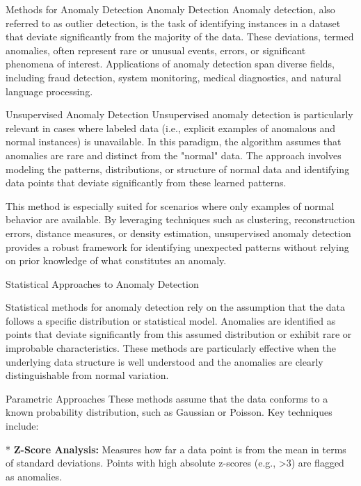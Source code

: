 \chap Methods for Anomaly Detection
\sec Anomaly Detection
Anomaly detection, also referred to as outlier detection, is the task of identifying instances in a dataset that deviate significantly from the majority of the data. These deviations, termed anomalies, often represent rare or unusual events, errors, or significant phenomena of interest. Applications of anomaly detection span diverse fields, including fraud detection, system monitoring, medical diagnostics, and natural language processing.


\secc Unsupervised Anomaly Detection
Unsupervised anomaly detection is particularly relevant in cases where labeled data (i.e., explicit examples of anomalous and normal instances) is unavailable. In this paradigm, the algorithm assumes that anomalies are rare and distinct from the "normal" data. The approach involves modeling the patterns, distributions, or structure of normal data and identifying data points that deviate significantly from these learned patterns.

This method is especially suited for scenarios where only examples of normal behavior are available. By leveraging techniques such as clustering, reconstruction errors, distance measures, or density estimation, unsupervised anomaly detection provides a robust framework for identifying unexpected patterns without relying on prior knowledge of what constitutes an anomaly.

\sec Statistical Approaches to Anomaly Detection

Statistical methods for anomaly detection rely on the assumption that the data follows a specific distribution or statistical model. Anomalies are identified as points that deviate significantly from this assumed distribution or exhibit rare or improbable characteristics. These methods are particularly effective when the underlying data structure is well understood and the anomalies are clearly distinguishable from normal variation.

\secc Parametric Approaches
These methods assume that the data conforms to a known probability distribution, such as Gaussian or Poisson. Key techniques include:

\begitems
* {\bf Z-Score Analysis:}\nl
Measures how far a data point is from the mean in terms of standard deviations. Points with high absolute z-scores (e.g., >3) are flagged as anomalies.


